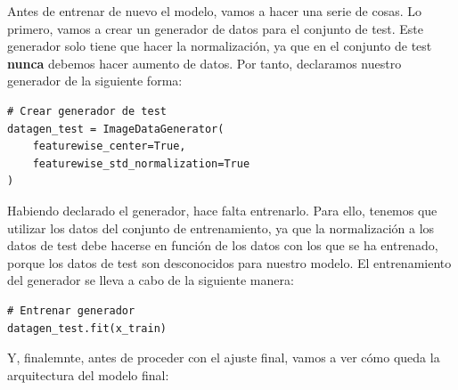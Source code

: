 \documentclass[11pt,a4paper]{article}
\begin{document}
Antes de entrenar de nuevo el modelo, vamos a hacer una serie de cosas. Lo primero, vamos
a crear un generador de datos para el conjunto de test. Este generador solo tiene que hacer
la normalización, ya que en el conjunto de test \textbf{nunca} debemos hacer aumento de datos.
Por tanto, declaramos nuestro generador de la siguiente forma:

\begin{lstlisting}
# Crear generador de test
datagen_test = ImageDataGenerator(
    featurewise_center=True,
    featurewise_std_normalization=True
)
\end{lstlisting}

Habiendo declarado el generador, hace falta entrenarlo. Para ello, tenemos que utilizar los
datos del conjunto de entrenamiento, ya que la normalización a los datos de test debe hacerse
en función de los datos con los que se ha entrenado, porque los datos de test son desconocidos
para nuestro modelo. El entrenamiento del generador se lleva a cabo de la siguiente manera:

\begin{lstlisting}
# Entrenar generador
datagen_test.fit(x_train)
\end{lstlisting}

Y, finalemnte, antes de proceder con el ajuste final, vamos a ver cómo queda la arquitectura del
modelo final:
\end{document}
